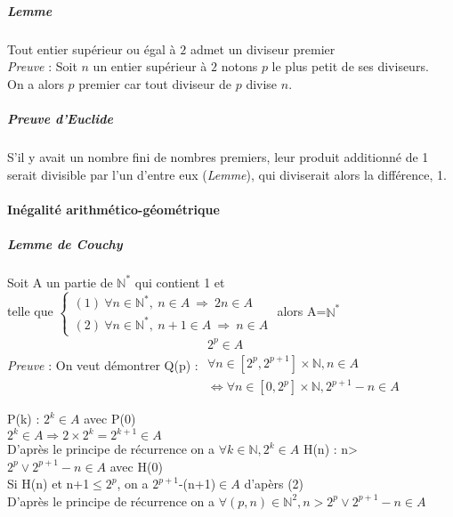         \subparagraph{Lemme}

            Tout entier supérieur ou égal à $2$ admet un diviseur premier
            \\\textsl{Preuve} : Soit $n$ un entier supérieur à $2$ notons $p$ le plus petit de ses diviseurs.
            \\On a alors $p$ premier car tout diviseur de $p$ divise $n$.

        \subparagraph{Preuve d'Euclide}

            S'il y avait un nombre fini de nombres premiers, leur produit additionné de 1 serait divisible par l'un d'entre eux (\textsl{Lemme}), qui diviserait alors la différence, 1.

        \paragraph{Inégalité arithmético-géométrique}

        \subparagraph{Lemme de Couchy}

            Soit A un partie de $\mathbb{N} ^*$ qui contient 1 et \\telle que
            $\left\{
            \begin{array}{l}
            (1) ~\forall n\in\mathbb{N} ^*,~n\in A~\Rightarrow ~2n\in A \\
            (2) ~\forall n\in\mathbb{N} ^*,~n+1\in A~\Rightarrow ~n\in A
            \end{array}
            \right.$
            alors A=$\mathbb{N} ^*$
            \\\textsl{Preuve} : On veut démontrer Q(p) : $\begin{array}{l}
            2^p\in A \\
            \forall n\in [2^p, 2^{p+1}]\times\mathbb{N} , n\in A\\
            \Leftrightarrow \forall n\in [0, 2^p]\times\mathbb{N} , 2^{p+1}-n\in A
            \end{array}$
            \begin{multicols}{2}
            P(k) : $2^k\in A$  avec P(0)
            \\$2^k\in A \Rightarrow 2\times 2^k=2^{k+1}\in A$
            \\D'après le principe de récurrence on a $\forall k\in\mathbb{N} , 2^k\in A$
            \columnbreak
            H(n) : n>$2^p\vee 2^{p+1}-n\in A$ avec H(0)
            \\Si H(n) et n+1$\leq 2^p$, on a $2^{p+1}$-(n+1)$\in A$ d'apèrs (2)
            \\D'après le principe de récurrence on a $\forall (p,n)\in\mathbb{N} ^2, n>2^p\vee 2^{p+1}-n\in A$
            \end{multicols}

